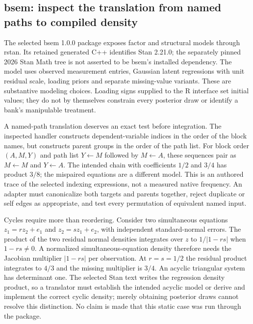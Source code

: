 \subsection{bsem: inspect the translation from named paths to compiled density}

The selected bsem 1.0.0 package exposes factor and structural models through
rstan. Its retained generated C++ identifies Stan 2.21.0; the separately pinned
2026 Stan Math tree is not asserted to be bsem's installed dependency. The
model uses observed measurement entries, Gaussian latent regressions with unit
residual scale, loading priors and separate missing-value variants. These are
substantive modeling choices. Loading signs supplied to the R interface set
initial values; they do not by themselves constrain every posterior draw or
identify a bank's manipulable treatment.~\citep{exec25_cmed_bsem}

A named-path translation deserves an exact test before integration. The inspected
handler constructs dependent-variable indices in the order of the block names,
but constructs parent groups in the order of the path list. For block order
$(A,M,Y)$ and path list $Y\leftarrow M$ followed by $M\leftarrow A$, these
sequences pair as $M\leftarrow M$ and $Y\leftarrow A$. The intended chain with
coefficients $1/2$ and $3/4$ has product $3/8$; the mispaired equations are a
different model. This is an authored trace of the selected indexing expressions,
not a measured native frequency. An adapter must canonicalize both targets and
parents together, reject duplicate or self edges as appropriate, and test every
permutation of equivalent named input.~\citep{exec25_cmed_bsem,exec25_cmed_choice}

Cycles require more than reordering. Consider two simultaneous equations
$z_1=r z_2+e_1$ and $z_2=s z_1+e_2$, with independent standard-normal errors.
The product of the two residual normal densities integrates over $z$ to
$1/|1-rs|$ when $1-rs\ne0$. A normalized simultaneous-equation density therefore
needs the Jacobian multiplier $|1-rs|$ per observation. At $r=s=1/2$ the
residual product integrates to $4/3$ and the missing multiplier is $3/4$.
An acyclic triangular system has determinant one. The selected Stan text writes
the regression density product, so a translator must establish the intended
acyclic model or derive and implement the correct cyclic density; merely
obtaining posterior draws cannot resolve this distinction. No claim is made
that this static case was run through the package.~\citep{exec25_cmed_bsem,exec25_cmed_choice}

